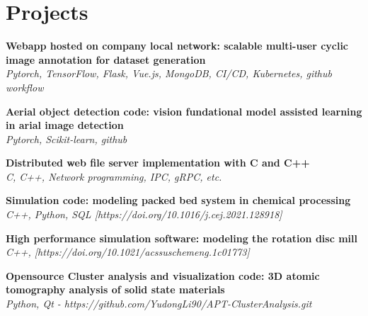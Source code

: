 \section{Projects}
\resumeSubHeadingListStart

    \resumeProjectHeading
    {\textbf{Webapp hosted on company local network: scalable multi-user cyclic image annotation for dataset generation} \\
     \emph{Pytorch, TensorFlow, Flask, Vue.js, MongoDB, CI/CD, Kubernetes, github workflow}}    {}

     \resumeProjectHeading
    {\textbf{Aerial object detection code: vision fundational model assisted learning in arial image detection} \\
     \emph{Pytorch, Scikit-learn, github}}    {}

     \resumeProjectHeading
     {\textbf{Distributed web file server implementation with C and C++} \\
      \emph{C, C++, Network programming, IPC, gRPC, etc.}}    {}
     
    \resumeProjectHeading
    {\textbf{Simulation code: modeling packed bed system in chemical processing} \\
     \emph{C++, Python, SQL [https://doi.org/10.1016/j.cej.2021.128918]}}    {}
    
    \resumeProjectHeading
    {\textbf{High performance simulation software: modeling the rotation disc mill}\\
    \emph{C++, [https://doi.org/10.1021/acssuschemeng.1c01773]}}{}

    \resumeProjectHeading
    {\textbf{Opensource Cluster analysis and visualization code: 3D atomic tomography analysis of solid state materials}\\
    \emph{Python, Qt   - https://github.com/YudongLi90/APT-ClusterAnalysis.git}} 
    

\resumeSubHeadingListEnd